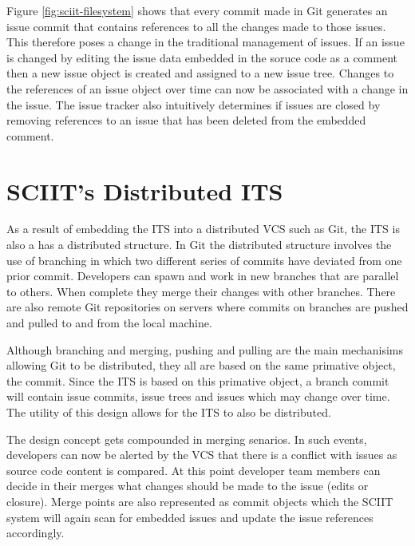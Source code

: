 \documentclass{mproj}
\begin{document}
Figure \ref{fig:sciit-filesystem} shows that every commit made in Git generates an issue commit that contains references to all the changes made to those issues. This therefore poses a change in the traditional management of issues. If an issue is changed by editing the issue data embedded in the soruce code as a comment then a new issue object is created and assigned to a new issue tree. Changes to the references of an issue object over time can now be associated with a change in the issue. The issue tracker also intuitively determines if issues are closed by removing references to an issue that has been deleted from the embedded comment.









\section{SCIIT's Distributed ITS}

As a result of embedding the ITS into a distributed VCS such as Git, the ITS is also a has a distributed structure. In Git the distributed structure involves the use of branching in which two different series of commits have deviated from one prior commit. Developers can spawn and work in new branches that are parallel to others. When complete they merge their changes with other branches. There are also remote Git repositories on servers where commits on branches are pushed and pulled to and from the local machine. 

Although branching and merging, pushing and pulling are the main mechanisims allowing Git to be distributed, they all are based on the same primative object, the commit. Since the ITS is based on this primative object, a branch commit will contain issue commits, issue trees and issues which may change over time. The utility of this design allows for the ITS to also be distributed.

The design concept gets compounded in merging senarios. In such events, developers can now be alerted by the VCS that there is a conflict with issues as source code content is compared. At this point developer team members can decide in their merges what changes should be made to the issue (edits or closure). Merge points are also represented as commit objects which the SCIIT system will again scan for embedded issues and update the issue references accordingly.
\end{document}
